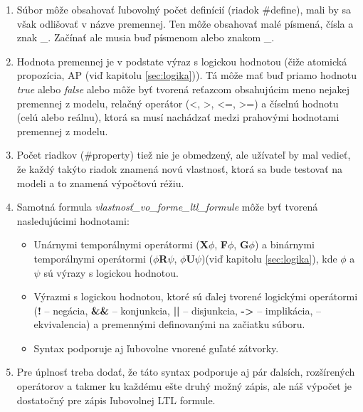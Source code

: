 \documentclass[11pt,final,oneside]{fithesis}
\begin{document}
\begin{enumerate}
\item S\'ubor m\^ o\v ze obsahova\v t \v lubovoln\'y po\v cet defin\'ici\'i (riadok \#define), mali by sa v\v sak odli\v sova\v t v n\'azve premennej. Ten m\^ o\v ze obsahova\v t
mal\'e p\'ismen\'a, \v c\'isla a znak \_. Za\v c\'ina\v t ale musia bu\v d p\'ismenom alebo znakom \_.
\item Hodnota premennej je v podstate v\'yraz s logickou hodnotou (\v ci\v ze atomick\'a propoz\'icia, AP (vi\v d kapitolu \ref{sec:logika})). T\'a m\^ o\v ze 
ma\v t bu\v d priamo
hodnotu {\it true} alebo {\it false} alebo m\^ o\v ze by\v t tvoren\'a re\v tazcom obsahuj\'ucim meno nejakej premennej z modelu, rela\v cn\'y oper\'ator (<, >, <=, >=) a \v c\'iseln\'u 
hodnotu (cel\'u alebo re\'alnu), ktor\'a sa mus\'i nach\'adza\v t medzi prahov\'ymi hodnotami premennej z modelu.
\item Po\v cet riadkov (\#property) tie\v z nie je obmedzen\'y, ale u\v z\'ivate\v l by mal vedie\v t, \v ze ka\v zd\'y tak\'yto riadok znamen\'a nov\'u 
vlastnos\v t, ktor\'a sa bude testova\v t na modeli a to znamen\'a v\'ypo\v ctov\'u r\'e\v ziu.
\item Samotn\'a formula {\it vlastnos\v t\_vo\_forme\_ltl\_formule} m\^ o\v ze by\v t tvoren\'a nasleduj\'ucimi hodnotami:
\begin{itemize}
\item Un\'arnymi tempor\'alnymi oper\'atormi ({\bf X}$\phi$, {\bf F}$\phi$, {\bf G}$\phi$) a bin\'arnymi tempor\'alnymi oper\'atormi ($\phi${\bf R}$\psi$, 
$\phi${\bf U}$\psi$)(vi\v d kapitolu \ref{sec:logika}), kde $\phi$ a $\psi$ s\'u v\'yrazy s logickou hodnotou.
\item V\'yrazmi s logickou hodnotou, ktor\'e s\'u \v dalej tvoren\'e logick\'ymi oper\'atormi ({\bf !} -- neg\'acia, {\bf \&\&} -- konjunkcia, {\bf ||} -- 
disjunkcia, {\bf ->} -- implik\'acia, {\bf <->} -- ekvivalencia) a premenn\'ymi definovan\'ymi na za\v ciatku s\'uboru.
\item Syntax podporuje aj \v lubovolne vnoren\'e gu\v lat\'e  z\'atvorky.
\end{itemize}
\item Pre \'uplnos\v t treba doda\v t, \v ze t\'ato syntax podporuje aj p\'ar \v dals\'ich, roz\v s\'iren\'ych oper\'atorov a takmer ku ka\v zd\'emu e\v ste
druh\'y mo\v zn\'y z\'apis, ale n\'a\v s v\'ypo\v cet je dostato\v cn\'y pre z\'apis \v lubovolnej LTL formule.
\end{enumerate}
\end{document}
